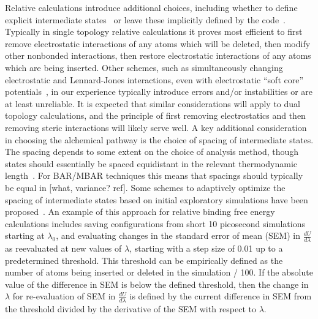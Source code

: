 \documentclass[9pt,bestpractices]{livecoms}
\begin{document}
%
Relative calculations introduce additional choices, including whether to define explicit intermediate states~\cite{} or leave these implicitly defined by the code~\cite{}.
Typically in single topology relative calculations it proves most efficient to first remove electrostatic interactions of any atoms which will be deleted, then modify other nonbonded interactions, then restore electrostatic interactions of any atoms which are being inserted.
Other schemes, such as simultaneously changing electrostatic and Lennard-Jones interactions, even with electrostatic ``soft core'' potentials~\cite{steinbrecher2007nonlinear}, in our experience typically introduce errors and/or instabilities or are at least unreliable.
It is expected that similar considerations will apply to dual topology calculations, and the principle of first removing electrostatics and then removing steric interactions will likely serve well.
%
A key additional consideration in choosing the alchemical pathway is the choice of spacing of intermediate states.
The spacing depends to some extent on the choice of analysis method, though states should essentially be spaced equidistant in the relevant thermodynamic length~\cite{}.
For BAR/MBAR techniques this means that spacings should typically be equal in [what, variance? ref].
Some schemes to adaptively optimize the spacing of intermediate states based on initial exploratory simulations have been proposed~\cite{}.
%
An example of this approach for relative binding free energy calculations includes saving configurations from short 10 picosecond simulations starting at $\lambda_0$, and evaluating changes in the standard error of mean (SEM) in $\frac{dU}{d\lambda}$ as reevaluated at new values of $\lambda$, starting with a step size of 0.01 up to a predetermined threshold.
This threshold can be empirically defined as the number of atoms being inserted or deleted in the simulation / 100.
If the absolute value of the difference in SEM is below the defined threshold, then the change in $\lambda$ for re-evaluation of SEM in $\frac{dU}{d\lambda}$ is defined by the current difference in SEM from the threshold divided by the derivative of the SEM with respect to $\lambda$.
%
\end{document}
